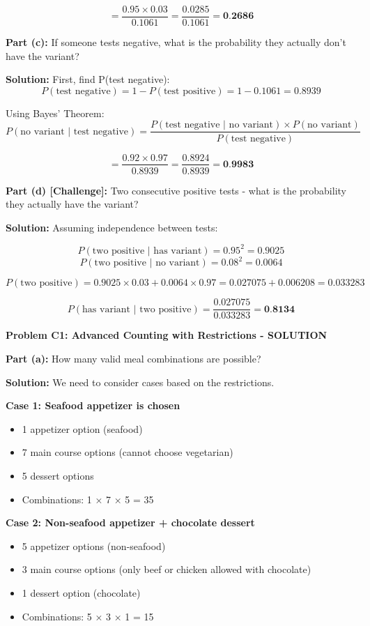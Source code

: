 \documentclass[
  11pt,
]{article}
\begin{document}
\[= \frac{0.95 \times 0.03}{0.1061} = \frac{0.0285}{0.1061} = \textbf{0.2686}\]

\textbf{Part (c):} If someone tests negative, what is the probability
they actually don't have the variant?

\textbf{Solution:} First, find P(test negative):
\[P(\text{test negative}) = 1 - P(\text{test positive}) = 1 - 0.1061 = 0.8939\]

Using Bayes' Theorem:
\[P(\text{no variant | test negative}) = \frac{P(\text{test negative | no variant}) \times P(\text{no variant})}{P(\text{test negative})}\]

\[= \frac{0.92 \times 0.97}{0.8939} = \frac{0.8924}{0.8939} = \textbf{0.9983}\]

\textbf{Part (d) {[}Challenge{]}:} Two consecutive positive tests - what
is the probability they actually have the variant?

\textbf{Solution:} Assuming independence between tests:

\[P(\text{two positive | has variant}) = 0.95^2 = 0.9025\]
\[P(\text{two positive | no variant}) = 0.08^2 = 0.0064\]

\[P(\text{two positive}) = 0.9025 \times 0.03 + 0.0064 \times 0.97 = 0.027075 + 0.006208 = 0.033283\]

\[P(\text{has variant | two positive}) = \frac{0.027075}{0.033283} = \textbf{0.8134}\]

\textbf{Problem C1: Advanced Counting with Restrictions - SOLUTION}

\textbf{Part (a):} How many valid meal combinations are possible?

\textbf{Solution:} We need to consider cases based on the restrictions.

\textbf{Case 1: Seafood appetizer is chosen}

\begin{itemize}
\item
  1 appetizer option (seafood)
\item
  7 main course options (cannot choose vegetarian)
\item
  5 dessert options
\item
  Combinations: 1 × 7 × 5 = 35
\end{itemize}

\textbf{Case 2: Non-seafood appetizer + chocolate dessert}

\begin{itemize}
\item
  5 appetizer options (non-seafood)
\item
  3 main course options (only beef or chicken allowed with chocolate)
\item
  1 dessert option (chocolate)
\item
  Combinations: 5 × 3 × 1 = 15
\end{itemize}
\end{document}

